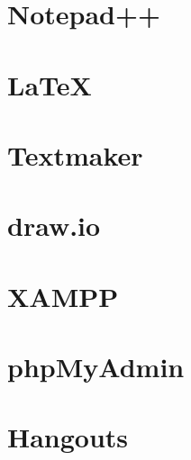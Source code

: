 \section{Notepad++}

\section{LaTeX}

\section{Textmaker}

\section{draw.io}

\section{XAMPP}

\section{phpMyAdmin}

\section{Hangouts}
